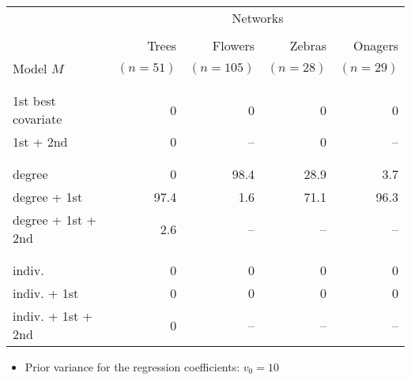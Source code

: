 \documentclass[8pt]{beamer}
\begin{document}
{\begin{center}
{\begin{tabular}{lrrrr}
    & \multicolumn{4}{c}{Networks} \\
    & & & \\
    & Trees &  Flowers &  Zebras &  Onagers \\
    Model $M$ & $(n=51)$ & $(n=105)$ & $(n=28)$ & $(n=29)$ \\    
    & & & \\    
    \hline
    & & & \\    
    1st best covariate & 0 & 0 & 0 & 0 \\
    1st + 2nd & 0 & -- & 0 & -- \\
    & & & \\    
    \hline
    & & & \\    
    degree & 0 & 98.4 & 28.9 & 3.7\\ 
    degree + 1st & 97.4 & 1.6 & 71.1 & 96.3\\ 
    degree + 1st + 2nd & 2.6 & -- & -- & -- \\ 
    & & & \\    
    \hline
    & & & \\    
    indiv. & 0 & 0 & 0 & 0 \\ 
    indiv. + 1st & 0 & 0 & 0 & 0 \\ 
    indiv. + 1st + 2nd & 0 & -- & -- & -- \\
  \end{tabular} }
  \end{center}
  
  \bigskip 
  {
  \begin{itemize}
  \item Prior variance for the regression coefficients: $v_0 = 10$
  \end{itemize}
  }

}

\backupend

\end{document}
